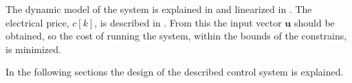 The dynamic model of the system is explained in  and linearized in . The electrical price, $c[k]$, is described in . From this the input vector $\pmb{u}$ should be obtained, so the cost of running the system, within the bounds of the constrains, is minimized. 



In the following sections the design of the described control system is explained. 







